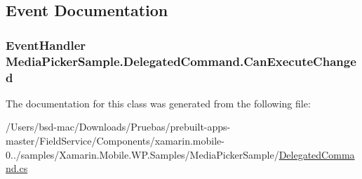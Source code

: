 \subsection{Event Documentation}
\hypertarget{class_media_picker_sample_1_1_delegated_command_ae9ef664e0723da5b6e5f334a9f51d47b}{
\subsubsection[{Can\+Execute\+Changed}]{\setlength{\rightskip}{0pt plus 5cm}Event\+Handler Media\+Picker\+Sample.\+Delegated\+Command.\+Can\+Execute\+Changed}}\label{class_media_picker_sample_1_1_delegated_command_ae9ef664e0723da5b6e5f334a9f51d47b}


The documentation for this class was generated from the following file\+:\begin{DoxyCompactItemize}
\item 
/\+Users/bsd-\/mac/\+Downloads/\+Pruebas/prebuilt-\/apps-\/master/\+Field\+Service/\+Components/xamarin.\+mobile-\/0../samples/\+Xamarin.\+Mobile.\+W\+P.\+Samples/\+Media\+Picker\+Sample/\hyperlink{_media_picker_sample_2_delegated_command_8cs}{Delegated\+Command.\+cs}\end{DoxyCompactItemize}
